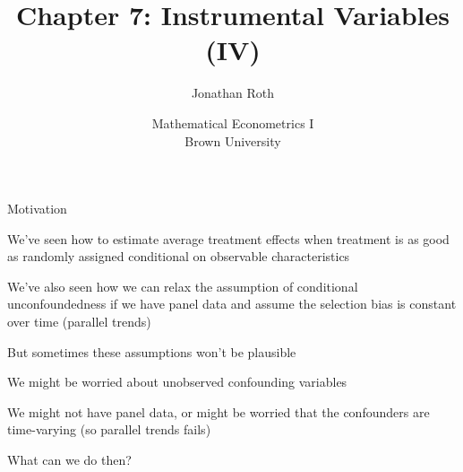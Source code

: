 \documentclass[11pt,english,handout]{beamer}
\newenvironment{wideitemize}{\itemize\addtolength{\itemsep}{10pt}}{\enditemize}
\begin{document}
	
	\begin{frame}[noframenumbering]{}
		\vspace{0.5cm}
		\title[]{Chapter 7: Instrumental Variables (IV)}
		\author{Jonathan Roth}
		\date{Mathematical Econometrics I \\ Brown University\\} 
		\titlepage {\small{}\ }\thispagestyle{empty} \vspace{-30pt}
		
	\end{frame}
	
	
	\begin{frame}{Motivation}
		
		\begin{wideitemize}
			\item
			We've seen how to estimate average treatment effects when treatment is as good as randomly assigned conditional on observable characteristics
			
			\item
			We've also seen how we can relax the assumption of conditional unconfoundedness if we have panel data and assume the selection bias is constant over time (parallel trends)
			
			
			\pause
			
			\item
			But sometimes these assumptions won't be plausible
			
			\pause
				\begin{itemize}
					{\normalsize					
					\item
					We might be worried about unobserved confounding variables
					
					\item
					We might not have panel data, or might be worried that the confounders are time-varying (so parallel trends fails)
					} 
				\end{itemize}			
			
			
			\pause
			
			\item
			What can we do then? 
		\end{wideitemize}
		
	\end{frame}
	
\end{document}
